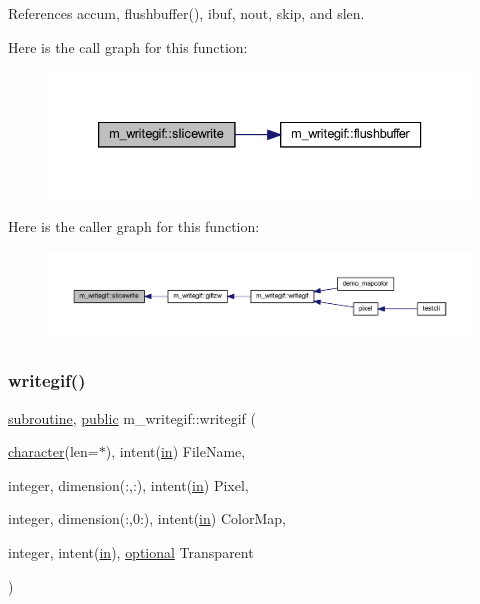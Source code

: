 References accum, flushbuffer(), ibuf, nout, skip, and slen.

Here is the call graph for this function\+:
\nopagebreak
\begin{figure}[H]
\begin{center}
\leavevmode
\includegraphics[width=333pt]{namespacem__writegif_a27e0ec2c6e05428641179bf35762adb7_cgraph}
\end{center}
\end{figure}
Here is the caller graph for this function\+:
\nopagebreak
\begin{figure}[H]
\begin{center}
\leavevmode
\includegraphics[width=350pt]{namespacem__writegif_a27e0ec2c6e05428641179bf35762adb7_icgraph}
\end{center}
\end{figure}
\mbox{\label{namespacem__writegif_a02be37849028b2f9484cff1b4285375d}} 
\subsubsection{\texorpdfstring{writegif()}{writegif()}}
{\footnotesize\ttfamily \hyperlink{M__stopwatch_83_8txt_acfbcff50169d691ff02d4a123ed70482}{subroutine}, \hyperlink{M__stopwatch_83_8txt_a2f74811300c361e53b430611a7d1769f}{public} m\+\_\+writegif\+::writegif (\begin{DoxyParamCaption}\item[{\hyperlink{option__stopwatch_83_8txt_abd4b21fbbd175834027b5224bfe97e66}{character}(len=$\ast$), intent(\hyperlink{M__journal_83_8txt_afce72651d1eed785a2132bee863b2f38}{in})}]{File\+Name,  }\item[{integer, dimension(\+:,\+:), intent(\hyperlink{M__journal_83_8txt_afce72651d1eed785a2132bee863b2f38}{in})}]{Pixel,  }\item[{integer, dimension(\+:,0\+:), intent(\hyperlink{M__journal_83_8txt_afce72651d1eed785a2132bee863b2f38}{in})}]{Color\+Map,  }\item[{integer, intent(\hyperlink{M__journal_83_8txt_afce72651d1eed785a2132bee863b2f38}{in}), \hyperlink{option__stopwatch_83_8txt_aa4ece75e7acf58a4843f70fe18c3ade5}{optional}}]{Transparent }\end{DoxyParamCaption})}



